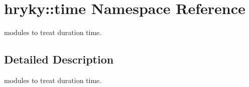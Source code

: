 \hypertarget{namespacehryky_1_1time}{\section{hryky\-:\-:time Namespace Reference}
\label{namespacehryky_1_1time}
}


modules to treat duration time.  




\subsection{Detailed Description}
modules to treat duration time. 